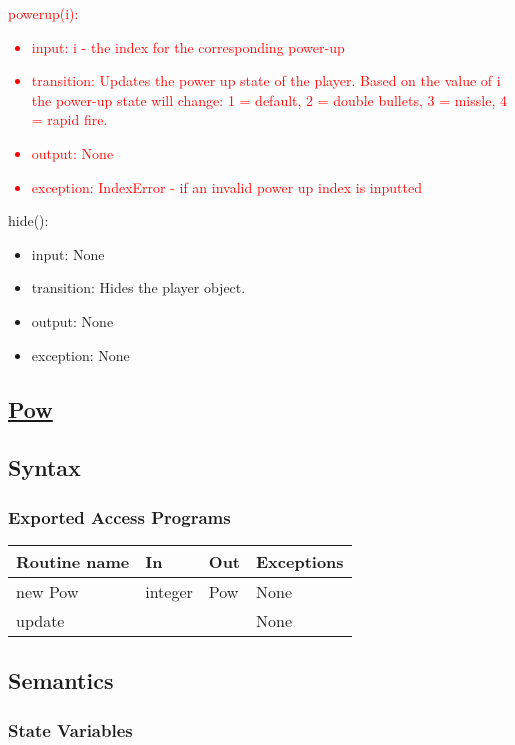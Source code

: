 \documentclass[12pt, titlepage]{article}
\begin{document}
\textcolor{red}{\noindent powerup(i):
\begin{itemize}
\item input: i - the index for the corresponding power-up
\item transition: Updates the power up state of the player. Based on the value of i the power-up state will change: 1 = default, 2 = double bullets, 3 = missle, 4 = rapid fire.
\item output: None
\item exception: IndexError - if an invalid power up index is inputted
\end{itemize}}

\noindent hide():
\begin{itemize}
\item input: None
\item transition: Hides the player object.
\item output: None
\item exception: None
\end{itemize}

\subsection* {\underline{Pow}} 
\subsection* {Syntax}

\subsubsection* {Exported Access Programs}

\begin{tabular}{| l | l | l | p{5cm} |}
\hline
\textbf{Routine name} & \textbf{In} & \textbf{Out} & \textbf{Exceptions}\\
\hline
new Pow & integer & Pow & None\\
\hline
update & & & None\\
\hline
\end{tabular}

\subsection* {Semantics}

\subsubsection* {State Variables}
\end{document}
